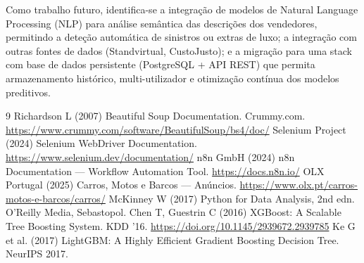 \documentclass[11pt,a4paper]{article}
\begin{document}
Como trabalho futuro, identifica-se a integração de modelos de Natural Language Processing (NLP) para análise semântica das descrições dos vendedores, permitindo a deteção automática de sinistros ou extras de luxo; a integração com outras fontes de dados (Standvirtual, CustoJusto); e a migração para uma stack com base de dados persistente (PostgreSQL + API REST) que permita armazenamento histórico, multi-utilizador e otimização contínua dos modelos preditivos.

\begin{thebibliography}{9}
 Richardson L (2007) Beautiful Soup Documentation. Crummy.com. \url{https://www.crummy.com/software/BeautifulSoup/bs4/doc/}
 Selenium Project (2024) Selenium WebDriver Documentation. \url{https://www.selenium.dev/documentation/}
 n8n GmbH (2024) n8n Documentation --- Workflow Automation Tool. \url{https://docs.n8n.io/}
 OLX Portugal (2025) Carros, Motos e Barcos --- Anúncios. \url{https://www.olx.pt/carros-motos-e-barcos/carros/}
 McKinney W (2017) Python for Data Analysis, 2nd edn. O'Reilly Media, Sebastopol.
 Chen T, Guestrin C (2016) XGBoost: A Scalable Tree Boosting System. KDD '16. \url{https://doi.org/10.1145/2939672.2939785}
 Ke G et al. (2017) LightGBM: A Highly Efficient Gradient Boosting Decision Tree. NeurIPS 2017.
\end{thebibliography}
\end{document}
